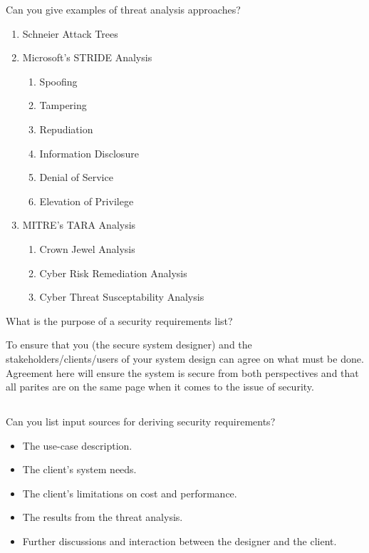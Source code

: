 \begin{questions}
\question{} Can you give examples of threat analysis approaches?
  \begin{solution}
    \begin{enumerate}[noitemsep]
    \item Schneier Attack Trees
    \item Microsoft's STRIDE Analysis
      \begin{enumerate}[noitemsep]
      \item Spoofing
      \item Tampering
      \item Repudiation
      \item Information Disclosure
      \item Denial of Service
      \item Elevation of Privilege
      \end{enumerate}
    \item MITRE's TARA Analysis
      \begin{enumerate}[noitemsep]
      \item Crown Jewel Analysis
      \item Cyber Risk Remediation Analysis
      \item Cyber Threat Susceptability Analysis
      \end{enumerate}
    \end{enumerate}
  \end{solution}

\question{} What is the purpose of a security requirements list?
  \begin{solution}
    To ensure that you (the secure system designer) and the stakeholders/clients/users of your system design can agree on what must be done.
    Agreement here will ensure the system is secure from both perspectives and that all parites are on the same page when it comes to the issue of security.
  \end{solution}

  \begin{parts}
  \part{} Can you list input sources for deriving security requirements?
    \begin{solution}
      \begin{itemize}[noitemsep]
      \item The use-case description.
      \item The client's system needs.
      \item The client's limitations on cost and performance.
      \item The results from the threat analysis.
      \item Further discussions and interaction between the designer and the client.
      \end{itemize}
    \end{solution}


\end{parts}
\end{questions}
